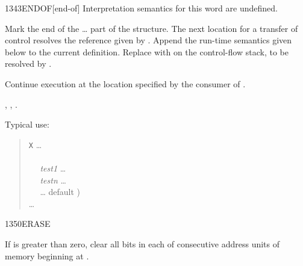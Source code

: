 \begin{worddef}{1343}{ENDOF}[end-of]
\interpret
	Interpretation semantics for this word are undefined.

\compile

	Mark the end of the \ldots{} part of the
	 structure. The next location for a transfer of
	control resolves the reference given by . Append
	the run-time semantics given below to the current definition.
	Replace  with  on the
	control-flow stack, to be resolved by .

\runtime
	\stack{}{}

	Continue execution at the location specified by the consumer
	of .

\see {},
	,
	.

	\begin{defer}
	\rationale %
		Typical use:
		\begin{quote}
			\word{:} \texttt{X} {\ldots} \\
			\tab {} \\
			\tab~~ \emph{test1}  {\ldots}  \\
			\tab~~ \emph{testn}  {\ldots}  \\
			\tab~~ {\ldots}  default ) \\
			\tab {} {\ldots} \\
			\word{;}
		\end{quote}
	\end{defer}
\end{worddef}


\begin{worddef}{1350}{ERASE}
\item {}

	If  is greater than zero, clear all bits in each of
	 consecutive address units of memory beginning at
	.
\end{worddef}


